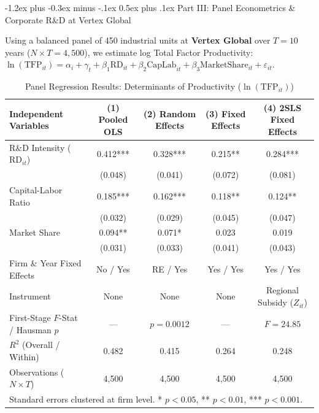\documentclass[11pt,a4paper]{article}
\makeatletter
\renewcommand{\section}{\@startsection{section}{1}{0pt}%
    {-1.2ex plus -0.3ex minus -.1ex}%
    {0.5ex plus .1ex}%
    {\normalfont\large\sffamily\bfseries\color{NavyPrimary}}}
\makeatother
\begin{document}
\clearpage

\section{Part III: Panel Econometrics \& Corporate R\&D at Vertex Global}

\begin{tcolorbox}[problembox, title={Problem 3: Panel Data Estimation of Productivity Dynamics (40 Points)}]
Using a balanced panel of 450 industrial units at \textbf{Vertex Global} over $T = 10$ years ($N \times T = 4,500$), we estimate log Total Factor Productivity: $\ln(\text{TFP}_{it}) = \alpha_i + \gamma_t + \beta_1 \text{RD}_{it} + \beta_2 \text{CapLab}_{it} + \beta_3 \text{MarketShare}_{it} + \varepsilon_{it}$.
\end{tcolorbox}

\begin{table}[htbp]
\centering
\caption{\sffamily Panel Regression Results: Determinants of Productivity ($\ln(\text{TFP}_{it})$)}
\label{tab:regression}
\vspace{2pt}
\scriptsize
\begin{tabularx}{\textwidth}{X *{4}{c}}
\toprule
\textbf{Independent Variables} & \textbf{(1) Pooled OLS} & \textbf{(2) Random Effects} & \textbf{(3) Fixed Effects} & \textbf{(4) 2SLS Fixed Effects} \\
\midrule
R\&D Intensity ($\text{RD}_{it}$) & 0.412*** & 0.328*** & 0.215** & 0.284*** \\
 & (0.048) & (0.041) & (0.072) & (0.081) \\
Capital-Labor Ratio & 0.185*** & 0.162*** & 0.118** & 0.124** \\
 & (0.032) & (0.029) & (0.045) & (0.047) \\
Market Share & 0.094** & 0.071* & 0.023 & 0.019 \\
 & (0.031) & (0.033) & (0.041) & (0.043) \\
\midrule
Firm \& Year Fixed Effects & No / Yes & RE / Yes & Yes / Yes & Yes / Yes \\
Instrument & None & None & None & Regional Subsidy ($Z_{it}$) \\
First-Stage $F$-Stat / Hausman $p$ & --- & $p=0.0012$ & --- & $F=24.85$ \\
$R^2$ (Overall / Within) & 0.482 & 0.415 & 0.264 & 0.248 \\
Observations ($N \times T$) & 4,500 & 4,500 & 4,500 & 4,500 \\
\bottomrule
\multicolumn{5}{l}{\tiny Standard errors clustered at firm level. * $p<0.05$, ** $p<0.01$, *** $p<0.001$.} \\
\end{tabularx}
\end{table}
\end{document}
